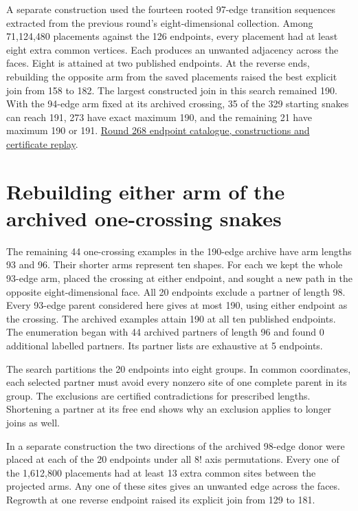 \documentclass[11pt,a4paper]{article}
\theoremstyle{definition}
\theoremstyle{remark}
\begin{document}
A separate construction used the fourteen rooted 97-edge transition
sequences extracted from the previous round's eight-dimensional
collection. Among 71,124,480 placements against the 126 endpoints,
every placement had at least eight extra common vertices. Each produces
an unwanted adjacency across the faces. Eight is attained at two
published endpoints. At the reverse ends, rebuilding the opposite arm
from the saved placements raised the best explicit join from 158 to 182.
The largest constructed join in this search remained 190.
With the 94-edge arm fixed at its archived crossing, 35 of the 329 starting snakes can reach 191, 273 have exact maximum 190, and the remaining 21 have maximum 190 or 191.
\href{https://github.com/hironaka-iori/Snake-in-the-box-in-9/tree/main/milestones/268-archived-94-arms}{Round 268 endpoint catalogue, constructions and certificate replay}.

\section{Rebuilding either arm of the archived one-crossing snakes}
The remaining 44 one-crossing examples in the 190-edge archive have
arm lengths 93 and 96. Their shorter arms represent ten shapes. For each
we kept the whole 93-edge arm, placed the crossing at either endpoint,
and sought a new path in the opposite eight-dimensional face. All 20
endpoints exclude a partner of length 98. Every 93-edge parent considered here gives at most 190, using either endpoint as the crossing. The archived examples attain 190 at all ten published endpoints.
The enumeration began with 44 archived partners of length 96 and found 0 additional labelled partners. Its partner lists are exhaustive at 5 endpoints.

The search partitions the 20 endpoints into eight groups. In common
coordinates, each selected partner must avoid every nonzero site of
one complete parent in its group. The exclusions are certified
contradictions for prescribed lengths. Shortening a partner at its
free end shows why an exclusion applies to longer joins as well.

In a separate construction the two directions of the archived 98-edge
donor were placed at each of the 20 endpoints under all \(8!\) axis
permutations. Every one of the 1,612,800 placements had at least
13 extra common sites between the projected arms. Any one of these
sites gives an unwanted edge across the faces. Regrowth at one reverse
endpoint raised its explicit join from 129 to 181.
\end{document}
